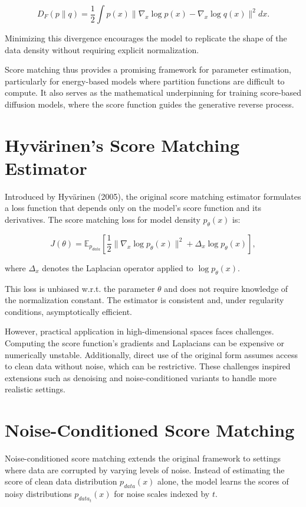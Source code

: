 \[
D_F(p \| q) = \frac{1}{2} \int p(x) \| \nabla_x \log p(x) - \nabla_x \log q(x) \|^2 dx.
\]

Minimizing this divergence encourages the model to replicate the shape of the data density without requiring explicit normalization.

Score matching thus provides a promising framework for parameter estimation, particularly for energy-based models where partition functions are difficult to compute. It also serves as the mathematical underpinning for training score-based diffusion models, where the score function guides the generative reverse process.

\section{Hyvärinen’s Score Matching Estimator}

Introduced by Hyvärinen (2005), the original score matching estimator formulates a loss function that depends only on the model's score function and its derivatives. The score matching loss for model density \( p_\theta(x) \) is:

\[
J(\theta) = \mathbb{E}_{p_{data}} \left[ \frac{1}{2} \| \nabla_x \log p_\theta(x) \|^2 + \Delta_x \log p_\theta(x) \right],
\]

where \( \Delta_x \) denotes the Laplacian operator applied to \( \log p_\theta(x) \).

This loss is unbiased w.r.t. the parameter \( \theta \) and does not require knowledge of the normalization constant. The estimator is consistent and, under regularity conditions, asymptotically efficient.

However, practical application in high-dimensional spaces faces challenges. Computing the score function's gradients and Laplacians can be expensive or numerically unstable. Additionally, direct use of the original form assumes access to clean data without noise, which can be restrictive. These challenges inspired extensions such as denoising and noise-conditioned variants to handle more realistic settings.

\section{Noise-Conditioned Score Matching}

Noise-conditioned score matching extends the original framework to settings where data are corrupted by varying levels of noise. Instead of estimating the score of clean data distribution \( p_{data}(x) \) alone, the model learns the scores of noisy distributions \( p_{data_t}(x) \) for noise scales indexed by \( t \).

